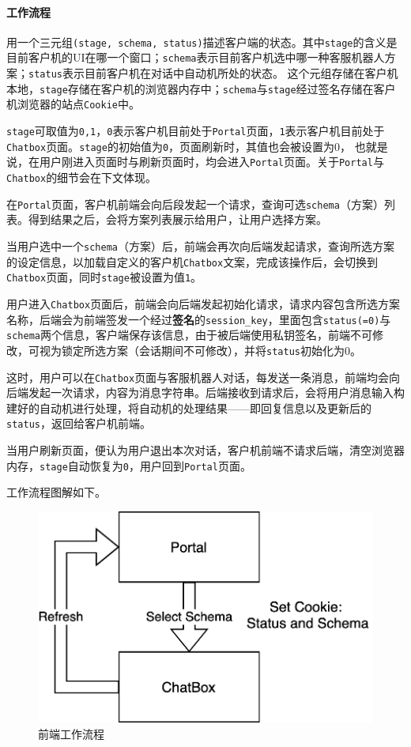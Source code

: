 \documentclass[hyperref]{ctexart}
\begin{document}
\paragraph{工作流程}
用一个三元组\texttt{(stage, schema, status)}描述客户端的状态。其中\texttt{stage}的含义是目前客户机的UI在哪一个窗口；\texttt{schema}表示目前客户机选中哪一种客服机器人方案；\texttt{status}表示目前客户机在对话中自动机所处的状态。
这个元组存储在客户机本地，\texttt{stage}存储在客户机的浏览器内存中；\texttt{schema}与\texttt{stage}经过签名存储在客户机浏览器的站点\texttt{Cookie}中。
\par \texttt{stage}可取值为\texttt{0,1}，\texttt{0}表示客户机目前处于\texttt{Portal}页面，\texttt{1}表示客户机目前处于\texttt{Chatbox}页面。\texttt{stage}的初始值为\texttt{0}，页面刷新时，其值也会被设置为0，
也就是说，在用户刚进入页面时与刷新页面时，均会进入\texttt{Portal}页面。关于\texttt{Portal}与\texttt{Chatbox}的细节会在下文体现。
\par 在\texttt{Portal}页面，客户机前端会向后段发起一个请求，查询可选\texttt{schema}（方案）列表。得到结果之后，会将方案列表展示给用户，让用户选择方案。
\par 当用户选中一个\texttt{schema}（方案）后，前端会再次向后端发起请求，查询所选方案的设定信息，以加载自定义的客户机\texttt{Chatbox}文案，完成该操作后，会切换到\texttt{Chatbox}页面，同时\texttt{stage}被设置为值\texttt{1}。
\par 用户进入\texttt{Chatbox}页面后，前端会向后端发起初始化请求，请求内容包含所选方案名称，后端会为前端签发一个经过{\bf 签名}的\texttt{session\_key}，里面包含\texttt{status(=0)}与\texttt{schema}两个信息，客户端保存该信息，由于被后端使用私钥签名，前端不可修改，可视为锁定所选方案（会话期间不可修改），并将\texttt{status}初始化为0。
\par 这时，用户可以在\texttt{Chatbox}页面与客服机器人对话，每发送一条消息，前端均会向后端发起一次请求，内容为消息字符串。后端接收到请求后，会将用户消息输入构建好的自动机进行处理，将自动机的处理结果——即回复信息以及更新后的\texttt{status}，返回给客户机前端。
\par 当用户刷新页面，便认为用户退出本次对话，客户机前端不请求后端，清空浏览器内存，\texttt{stage}自动恢复为\texttt{0}，用户回到\texttt{Portal}页面。
\par 工作流程图解如下。
\begin{figure}[H]
    \centering
    \includegraphics[scale=0.16]{figure/2.png}
    \caption{前端工作流程}
    \label{Fig.1.2}
\end{figure}
\end{document}
